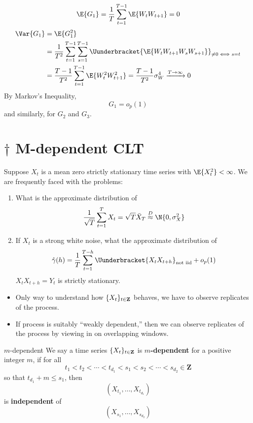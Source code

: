 \begin{Example}{}{}
    \[ \E{G_{1}}=\frac{1}{T} \sum_{t=1}^{T-1} \E{W_{t}W_{t+1}}=0 \]
    \begin{align*}
        \Var{G_{1}}
         & =\E{G_{1}^2}                                                                                                \\
         & =\frac{1}{T^2}\sum_{t=1}^{T-1} \sum_{s=1}^{T-1}\Uunderbracket{\E{W_{t}W_{t+1}W_{s}W_{s+1}}}_{\ne 0\iff s=t} \\
         & =\frac{T-1}{T^2} \sum_{t=1}^{T-1} \E{W_{t}^2W_{t+1}^2}=\frac{T-1}{T^2} \sigma_W^4\xrightarrow{T\to\infty}0
    \end{align*}
    By Markov's Inequality,
    \[ G_{1}=o_p(1) \]
    and similarly, for $ G_{2} $ and $ G_{3} $.
\end{Example}
\section{\texorpdfstring{$ \dagger $}{†} M-dependent CLT}
Suppose $ X_t $ is a mean zero strictly stationary time series
with $ \E{X_t^2}<\infty $. We are frequently faced
with the problems:
\begin{enumerate}[(1)]
    \item What is the approximate distribution of
          \[ \frac{1}{\sqrt{T}} \sum_{t=1}^{T} X_t=\sqrt{T}\bar{X}_T\stackrel{D}{\approx}\N{0,\sigma_X^2} \]
    \item If $ X_t $ is a strong white noise, what the approximate distribution of
          \[ \hat{\gamma}(h)=\frac{1}{T} \sum_{t=1}^{T-h}\Uunderbracket{X_t X_{t+h}}_{\text{not iid}}+o_p(1) \]
          $ X_t X_{t+h}=Y_{t} $ is strictly stationary.
\end{enumerate}
\begin{itemize}
    \item Only way to understand how $ \{X_t\}_{t\in\mathbf{Z}} $ behaves,
          we have to observe replicates of the process.
    \item If process is suitably ``weakly dependent,'' then we can observe
          replicates of the process by viewing in on overlapping windows.
\end{itemize}
\begin{Definition}{$ m $-dependent}{}
    We say a time series $ \{X_t\}_{t\in\mathbf{Z}} $ is $ m $\textbf{-dependent}
    for a positive integer $ m $, if for all
    \[ t_1<t_2<\cdots<t_{d_1}<s_1<s_2<\cdots<s_{d_2}\in\mathbf{Z} \]
    so that $ t_{d_1}+m\le s_1 $, then
    \[ (X_{t_1},\ldots,X_{t_{d_1}}) \]
    is \textbf{independent} of
    \[ (X_{s_1},\ldots,X_{s_{d_2}}) \]
\end{Definition}
